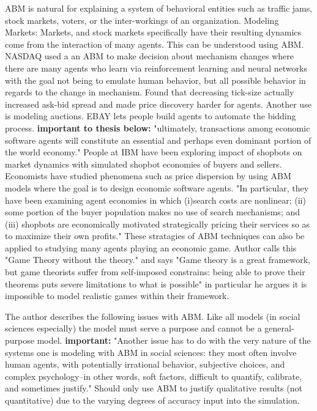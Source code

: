 \documentclass[12pt,twoside]{reedthesis}
\begin{document}
ABM is natural for explaining a system of behavioral entities such as traffic jams, stock markets, voters, or the inter-workings of an organization. Modeling Markets: Markets, and stock markets specifically have their resulting dynamics come from the interaction of many agents. This can be understood using ABM. NASDAQ used a an ABM to make decision about mechanism changes where there are many agents who learn via reinforcement learning and neural networks with the goal not being to emulate human behavior, but all possible behavior in regards to the change in mechanism. Found that decreasing tick-size actually increased ask-bid spread and made price discovery harder for agents. Another use is modeling auctions. EBAY lets people build agents to automate the bidding process. \textbf{important to thesis below:} "ultimately, transactions among economic software agents will constitute an essential and perhaps even dominant portion of the world economy." People at IBM have been exploring impact of shopbots on market dynamics with simulated shopbot economies of buyers and sellers. Economists have studied phenomena such as price dispersion by using ABM models where the goal is to design economic software agents. "In particular, they have been examining agent economies in which (i)search costs are nonlinear; (ii) some portion of the buyer population makes no use of search mechanisms; and (iii) shopbots are economically motivated strategically pricing their services so as to maximize their own profits." These stratagies of ABM techniques can also be applied to studying many agents playing an economic game. Author calls this "Game Theory without the theory." and says "Game theory is a great framework, but game theorists suffer from self-imposed constrains: being able to prove their theorems puts severe limitations to what is possible" in particular he argues it is impossible to model realistic games within their framework.

The author describes the following issues with ABM. Like all models (in social sciences especially) the model must serve a purpose and cannot be a general-purpose model. \textbf{important:} 
"Another issue has to do with the very nature of the systems one is modeling with ABM in social sciences: they most often involve human agents, with potentially irrational behavior, subjective choices, and complex psychology--in other words, soft factors, difficult to quantify, calibrate, and sometimes justify." Should only use ABM to justify qualitative results (not quantitative) due to the varying degrees of accuracy input into the simulation. 
\cite{Bonabeau2002} \\
\end{document}
